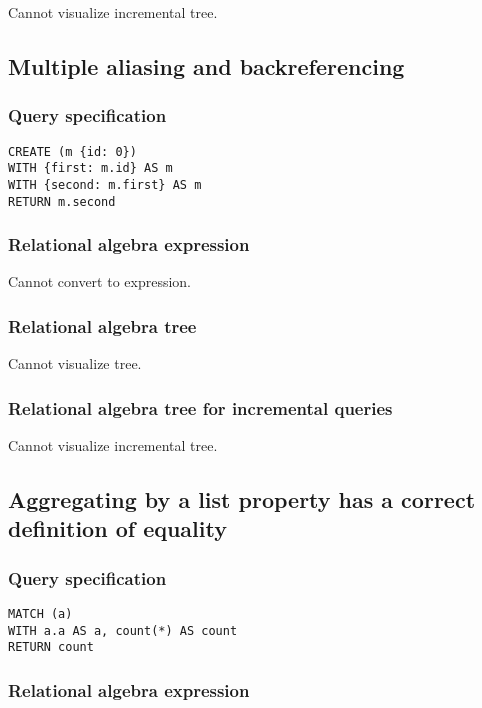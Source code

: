 Cannot visualize incremental tree.

\subsection{Multiple aliasing and backreferencing}

\subsubsection*{Query specification}

\begin{lstlisting}
CREATE (m {id: 0})
WITH {first: m.id} AS m
WITH {second: m.first} AS m
RETURN m.second
\end{lstlisting}

\subsubsection*{Relational algebra expression}

Cannot convert to expression.

\subsubsection*{Relational algebra tree}

Cannot visualize tree.

\subsubsection*{Relational algebra tree for incremental queries}

Cannot visualize incremental tree.

\subsection{Aggregating by a list property has a correct definition of equality}

\subsubsection*{Query specification}

\begin{lstlisting}
MATCH (a)
WITH a.a AS a, count(*) AS count
RETURN count
\end{lstlisting}

\subsubsection*{Relational algebra expression}

